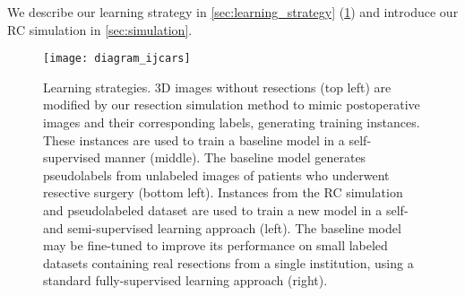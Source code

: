 We describe our learning strategy in \cref{sec:learning_strategy} (\cref{fig:diagram_ijcars})
and introduce our \ac{RC} simulation in \cref{sec:simulation}.

\begin{figure}
  \centering
  \texttt{[image: diagram\_ijcars]}
  \caption[Learning strategies for cavity segmentation]{
    Learning strategies.
    3D images without resections (top left) are modified by our resection simulation method to mimic postoperative images and their corresponding labels, generating training instances.
    These instances are used to train a baseline model in a self-supervised manner (middle).
    The baseline model generates pseudolabels from unlabeled images of patients who underwent resective surgery (bottom left).
    Instances from the \ac{RC} simulation and pseudolabeled dataset are used to train a new model in a self- and semi-supervised learning approach (left).
    The baseline model may be fine-tuned to improve its performance on small labeled datasets containing real resections from a single institution, using a standard fully-supervised learning approach (right).
  }
  \label{fig:diagram_ijcars}
\end{figure}
